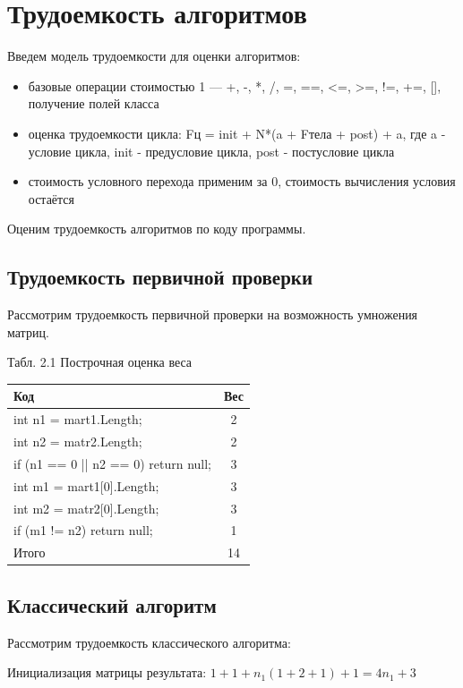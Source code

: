 \documentclass[12pt]{report}
\begin{document}
\newpage
\section{Трудоемкость алгоритмов}
Введем модель трудоемкости для оценки алгоритмов: 
\begin{itemize}
	\item базовые операции стоимостью 1 — +, -, *, /, =, ==, <=, >=, !=, +=, [], получение полей класса
	\item оценка трудоемкости цикла: Fц = init +  N*(a + Fтела + post) + a, где a - условие цикла, init - предусловие цикла, post - постусловие цикла
	\item стоимость условного перехода применим за 0, стоимость вычисления условия остаётся
\end{itemize}

Оценим трудоемкость алгоритмов по коду программы.

\subsection{Трудоемкость первичной проверки}
Рассмотрим трудоемкость первичной проверки на возможность умножения матриц.

\begin{center}
Табл. 2.1 Построчная оценка веса
	\begin{tabular}{|l c|} 
 	\hline
	Код & Вес \\ [0.5ex] 
 	\hline\hline
 	 int n1 = mart1.Length; & 2\\
 	\hline
	int n2 = matr2.Length; & 2\\
	\hline
	 if (n1  == 0 || n2 == 0) return null; & 3\\
	\hline
	int m1 = mart1[0].Length; & 3\\
	\hline
	int m2 = matr2[0].Length; & 3\\
	\hline
	if (m1 != n2) return null; & 1\\
	\hline\hline
	Итого & 14\\
	\hline
	\end{tabular}
\end{center}

\subsection{Классический алгоритм}
Рассмотрим трудоемкость классического алгоритма:  

Инициализация матрицы результата: $1 + 1 + n_1(1 + 2 + 1) + 1 = 4n_1 + 3$
\end{document}
